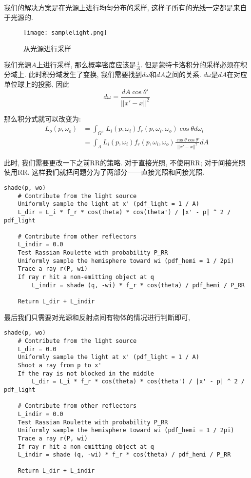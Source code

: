 我们的解决方案是在光源上进行均匀分布的采样, 这样子所有的光线一定都是来自于光源的. 

\begin{figure}[H]
	\centering
	\texttt{[image: samplelight.png]}
	\caption{从光源进行采样}
	\label{fig:samplelight}
\end{figure}

我们光源$A$上进行采样, 那么概率密度应该是$\frac{1}{A}$. 但是蒙特卡洛积分的采样必须在积分域上. 此时积分域发生了变换, 我们需要找到$d\omega$和$dA$之间的关系. $d\omega$是$dA$在对应单位球上的投影, 因此
\begin{equation}
	d\omega = \frac{dA\cos\theta'}{||x'-x||^2}
\end{equation}

那么积分式就可以改变为: 
\begin{equation}
	\begin{split}
		L_o(p,\omega_o)&=\int_{\Omega^+}L_i(p,\omega_i)f_r(p,\omega_i,\omega_o)\cos\theta d\omega_i\\
		&=\int_AL_i(p,\omega_i)f_r(p,\omega_i,\omega_o)\frac{\cos\theta\cos\theta'}{||x'-x||^2}dA
	\end{split}
\end{equation}

此时, 我们需要更改一下之前RR的策略. 对于直接光照, 不使用RR; 对于间接光照使用RR. 这样我们就把问题分为了两部分——直接光照和间接光照. 

\begin{lstlisting}[caption=采用光源上均匀分布渲染函数伪代码]
shade(p, wo)
	# Contribute from the light source
	Uniformly sample the light at x' (pdf_light = 1 / A)
	L_dir = L_i * f_r * cos(theta) * cos(theta') / |x' - p| ^ 2 / pdf_light
	
	# Contribute from other reflectors
	L_indir = 0.0
	Test Rassian Roulette with probability P_RR
	Uniformly sample the hemisphere toward wi (pdf_hemi = 1 / 2pi)
	Trace a ray r(P, wi)
	If ray r hit a non-emitting object at q
		L_indir = shade (q, -wi) * f_r * cos(theta) / pdf_hemi / P_RR
	
	Return L_dir + L_indir
\end{lstlisting}

最后我们只需要对光源和反射点间有物体的情况进行判断即可, 

\begin{lstlisting}[caption=渲染函数伪代码]
	shade(p, wo)
	# Contribute from the light source
	L_dir = 0.0
	Uniformly sample the light at x' (pdf_light = 1 / A)
	Shoot a ray from p to x'
	If the ray is not blocked in the middle
		L_dir = L_i * f_r * cos(theta) * cos(theta') / |x' - p| ^ 2 / pdf_light
	
	# Contribute from other reflectors
	L_indir = 0.0
	Test Rassian Roulette with probability P_RR
	Uniformly sample the hemisphere toward wi (pdf_hemi = 1 / 2pi)
	Trace a ray r(P, wi)
	If ray r hit a non-emitting object at q
	L_indir = shade (q, -wi) * f_r * cos(theta) / pdf_hemi / P_RR
	
	Return L_dir + L_indir
\end{lstlisting}

